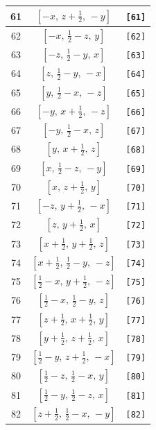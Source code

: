 \documentclass[fleqn,8pt]{jsarticle}
\begin{document}
\begin{longtable}{ccc}
61 & $\left[ - x,\, z + \frac{1}{2},\, - y \right]$ & {\tt [61]} \\ \hline
62 & $\left[ - x,\, \frac{1}{2} - z,\, y \right]$ & {\tt [62]} \\ \hline
63 & $\left[ - z,\, \frac{1}{2} - y,\, x \right]$ & {\tt [63]} \\ \hline
64 & $\left[ z,\, \frac{1}{2} - y,\, - x \right]$ & {\tt [64]} \\ \hline
65 & $\left[ y,\, \frac{1}{2} - x,\, - z \right]$ & {\tt [65]} \\ \hline
66 & $\left[ - y,\, x + \frac{1}{2},\, - z \right]$ & {\tt [66]} \\ \hline
67 & $\left[ - y,\, \frac{1}{2} - x,\, z \right]$ & {\tt [67]} \\ \hline
68 & $\left[ y,\, x + \frac{1}{2},\, z \right]$ & {\tt [68]} \\ \hline
69 & $\left[ x,\, \frac{1}{2} - z,\, - y \right]$ & {\tt [69]} \\ \hline
70 & $\left[ x,\, z + \frac{1}{2},\, y \right]$ & {\tt [70]} \\ \hline
71 & $\left[ - z,\, y + \frac{1}{2},\, - x \right]$ & {\tt [71]} \\ \hline
72 & $\left[ z,\, y + \frac{1}{2},\, x \right]$ & {\tt [72]} \\ \hline
73 & $\left[ x + \frac{1}{2},\, y + \frac{1}{2},\, z \right]$ & {\tt [73]} \\ \hline
74 & $\left[ x + \frac{1}{2},\, \frac{1}{2} - y,\, - z \right]$ & {\tt [74]} \\ \hline
75 & $\left[ \frac{1}{2} - x,\, y + \frac{1}{2},\, - z \right]$ & {\tt [75]} \\ \hline
76 & $\left[ \frac{1}{2} - x,\, \frac{1}{2} - y,\, z \right]$ & {\tt [76]} \\ \hline
77 & $\left[ z + \frac{1}{2},\, x + \frac{1}{2},\, y \right]$ & {\tt [77]} \\ \hline
78 & $\left[ y + \frac{1}{2},\, z + \frac{1}{2},\, x \right]$ & {\tt [78]} \\ \hline
79 & $\left[ \frac{1}{2} - y,\, z + \frac{1}{2},\, - x \right]$ & {\tt [79]} \\ \hline
80 & $\left[ \frac{1}{2} - z,\, \frac{1}{2} - x,\, y \right]$ & {\tt [80]} \\ \hline
81 & $\left[ \frac{1}{2} - y,\, \frac{1}{2} - z,\, x \right]$ & {\tt [81]} \\ \hline
82 & $\left[ z + \frac{1}{2},\, \frac{1}{2} - x,\, - y \right]$ & {\tt [82]} \\ \hline

\end{longtable}
\end{document}
